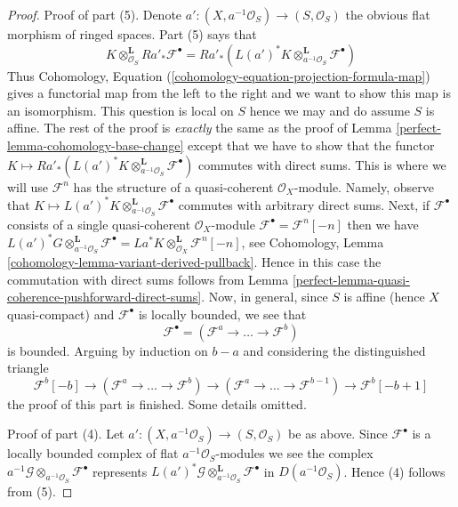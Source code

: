 \begin{proof}
\medskip\noindent
Proof of part (5). Denote
$a' : (X, a^{-1}\mathcal{O}_S) \to (S, \mathcal{O}_S)$
the obvious flat morphism of ringed spaces. Part (5) says that
$$
K \otimes_{\mathcal{O}_S}^\mathbf{L} Ra'_*\mathcal{F}^\bullet =
Ra'_*(L(a')^*K \otimes_{a^{-1}\mathcal{O}_S}^\mathbf{L}
\mathcal{F}^\bullet)
$$
Thus
Cohomology, Equation (\ref{cohomology-equation-projection-formula-map})
gives a functorial map from the left to the right and we want to show
this map is an isomorphism.
This question is local on $S$ hence we may and do assume $S$
is affine. The rest of the proof is {\it exactly} the same as the
proof of Lemma \ref{perfect-lemma-cohomology-base-change} except that we have
to show that the functor
$K \mapsto Ra'_*(L(a')^*K \otimes_{a^{-1}\mathcal{O}_S}^\mathbf{L}
\mathcal{F}^\bullet)$ commutes with direct sums.
This is where we will use $\mathcal{F}^n$ has the structure
of a quasi-coherent $\mathcal{O}_X$-module. Namely, observe that
$K \mapsto L(a')^*K
\otimes_{a^{-1}\mathcal{O}_S}^\mathbf{L} \mathcal{F}^\bullet$
commutes with arbitrary direct sums. Next, if
$\mathcal{F}^\bullet$ consists of a single quasi-coherent
$\mathcal{O}_X$-module $\mathcal{F}^\bullet = \mathcal{F}^n[-n]$
then we have $L(a')^*G
\otimes_{a^{-1}\mathcal{O}_S}^\mathbf{L} \mathcal{F}^\bullet =
La^*K \otimes_{\mathcal{O}_X}^\mathbf{L} \mathcal{F}^n[-n]$, see
Cohomology, Lemma \ref{cohomology-lemma-variant-derived-pullback}.
Hence in this case the commutation with direct sums follows from
Lemma \ref{perfect-lemma-quasi-coherence-pushforward-direct-sums}.
Now, in general, since $S$ is affine (hence $X$ quasi-compact)
and $\mathcal{F}^\bullet$ is locally bounded, we see that
$$
\mathcal{F}^\bullet = (\mathcal{F}^a \to \ldots \to \mathcal{F}^b)
$$
is bounded. Arguing by induction on $b - a$ and considering the
distinguished triangle
$$
\mathcal{F}^b[-b] \to (\mathcal{F}^a \to \ldots \to \mathcal{F}^b)
\to (\mathcal{F}^a \to \ldots \to \mathcal{F}^{b - 1}) \to
\mathcal{F}^b[-b + 1]
$$
the proof of this part is finished. Some details omitted.

\medskip\noindent
Proof of part (4). Let $a' : (X, a^{-1}\mathcal{O}_S) \to (S, \mathcal{O}_S)$
be as above. Since $\mathcal{F}^\bullet$ is a locally bounded
complex of flat $a^{-1}\mathcal{O}_S$-modules we see the complex
$a^{-1}\mathcal{G} \otimes_{a^{-1}\mathcal{O}_S} \mathcal{F}^\bullet$
represents $L(a')^*\mathcal{G}
\otimes_{a^{-1}\mathcal{O}_S}^\mathbf{L}
\mathcal{F}^\bullet$ in $D(a^{-1}\mathcal{O}_S)$. Hence (4)
follows from (5).
\end{proof}


